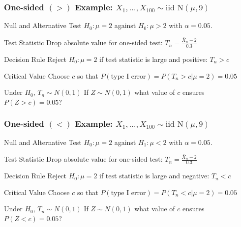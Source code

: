 \begin{frame}
  \frametitle{One-sided $(>)$ Example: $X_1, \dots, X_{100} \sim \mbox{iid N}(\mu,9)$}
  \begin{block}{Null and Alternative}
  Test $H_0\colon \mu =2$ against $H_0\colon \mu >2$ with $\alpha = 0.05$. 
  \end{block}

  \pause

  \begin{block}{Test Statistic}
    Drop absolute value for one-sided test: $\displaystyle T_n = \frac{\bar{X}_n - 2}{0.3}$ 
  \end{block}

  \pause

  \begin{block}{Decision Rule}
    Reject $H_0\colon \mu =2$ if test statistic is \alert{large and positive}: $T_n > c$ 
  \end{block}

  \pause

  \begin{block}{Critical Value}
    Choose $c$ so that $P(\mbox{type I error}) = P(T_n > c|\mu =2) = 0.05$ 
  \end{block}

  \pause

  \begin{block}{Under $H_0$, $T_n \sim N(0,1)$}
   If $Z\sim N(0,1)$ what value of $c$ ensures $P(Z>c) = 0.05$? 
  \end{block}
\end{frame}
\begin{frame}
  \frametitle{One-sided $(<)$ Example: $X_1, \dots, X_{100} \sim \mbox{iid N}(\mu,9)$}
  \begin{block}{Null and Alternative}
  Test $H_0\colon \mu =2$ against $H_1\colon \mu <2$ with $\alpha = 0.05$. 
  \end{block}

  \pause

  \begin{block}{Test Statistic}
    Drop absolute value for one-sided test: $\displaystyle T_n = \frac{\bar{X}_n - 2}{0.3}$ 
  \end{block}

  \pause

  \begin{block}{Decision Rule}
    Reject $H_0\colon \mu =2$ if test statistic is \alert{large and negative}: $T_n < c$ 
  \end{block}

  \pause

  \begin{block}{Critical Value}
    Choose $c$ so that $P(\mbox{type I error}) = P(T_n < c|\mu =2) = 0.05$ 
  \end{block}

  \pause

  \begin{block}{Under $H_0$, $T_n \sim N(0,1)$}
   If $Z\sim N(0,1)$ what value of $c$ ensures $P(Z<c) = 0.05$? 
  \end{block}
\end{frame}
